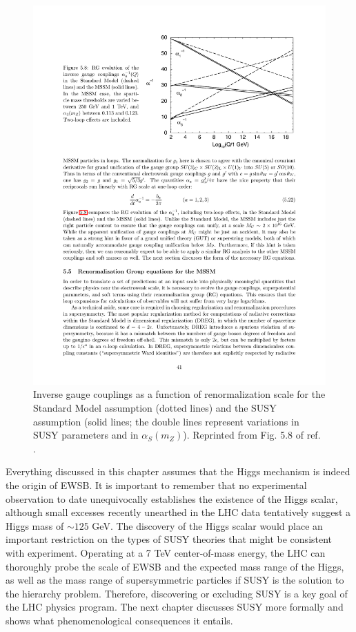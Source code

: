 \documentclass[dissertation.tex]{subfiles}
\begin{document}
\begin{figure}
	\centering
	\includegraphics[scale=1.0]{SUSY_grand_unification}
	\caption{Inverse gauge couplings as a function of renormalization scale for the Standard Model assumption (dotted lines) and the SUSY assumption (solid lines; the double lines represent variations in SUSY parameters and in $\alpha_{S}(m_{Z})$).  Reprinted from Fig. 5.8 of ref. \cite{SUSY_primer}.}
	\label{fig:SUSY_grand_unification}
\end{figure}

Everything discussed in this chapter assumes that the Higgs mechanism is indeed the origin of EWSB.  It is important to remember that no experimental observation to date unequivocally establishes the existence of the Higgs scalar, although small excesses recently unearthed in the LHC data \cite{Chatrchyan201226,Aad201249} tentatively suggest a Higgs mass of $\sim125$ GeV.  The discovery of the Higgs scalar would place an important restriction on the types of SUSY theories that might be consistent with experiment.  Operating at a 7 TeV center-of-mass energy, the LHC can thoroughly probe the scale of EWSB and the expected mass range of the Higgs, as well as the mass range of supersymmetric particles if SUSY is the solution to the hierarchy problem.  Therefore, discovering or excluding SUSY is a key goal of the LHC physics program.  The next chapter discusses SUSY more formally and shows what phenomenological consequences it entails.
\end{document}
